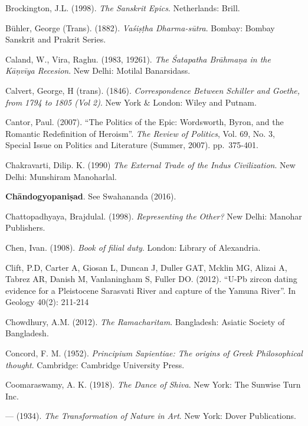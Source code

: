 \begin{thebibliography}{99}
Brockington, J.L. (1998). {\sl The Sanskrit Epics}. Netherlands: Brill.

Bühler, George (Trans). (1882). {\sl Vaśiṣṭha Dharma-sūtra}. Bombay: Bombay Sanskrit and Prakrit Series. 

Caland, W., Vira, Raghu. (1983, 19261). {\sl The Śatapatha Brāhmaṇa in the Kāṇvīya Recesion}. New Delhi: Motilal Banarsidass. 

Calvert, George, H (trans). (1846). {\sl Correspondence Between Schiller and Goethe, from 1794 to 1805 (Vol 2)}. New York \& London: Wiley and Putnam.  

Cantor, Paul. (2007). “The Politics of the Epic: Wordsworth, Byron, and the Romantic Redefinition of Heroism”. {\sl The Review of Politics}, Vol. 69, No. 3, Special Issue on Politics and Literature (Summer, 2007). pp.~375-401.

Chakravarti, Dilip. K. (1990) {\sl The External Trade of the Indus Civilization}. New Delhi: Munshiram Manoharlal. 

{\bf Chāndogyopaniṣad}. See Swahananda (2016).

Chattopadhyaya, Brajdulal. (1998). {\sl Representing the Other?} New Delhi: Manohar Publishers. 

Chen, Ivan. (1908). {\sl Book of filial duty}. London: Library of Alexandria. 

Clift, P.D, Carter A, Giosan L, Duncan J, Duller GAT, Mcklin MG, Alizai A, Tabrez AR, Danish M, Vanlaningham S, Fuller DO. (2012). “U-Pb zircon dating evidence for a Pleistocene Sarasvati River and capture of the Yamuna River”. In Geology 40(2): 211-214

Chowdhury, A.M. (2012). {\sl The Ramacharitam}. Bangladesh: Asiatic Society of Bangladesh. 

Concord, F. M. (1952). {\sl Principium Sapientiae: The origins of Greek Philosophical thought}. Cambridge: Cambridge University Press. 

Coomaraswamy, A. K. (1918). {\sl The Dance of Shiva}. New York: The Sunwise Turn Inc. 

--- (1934). {\sl The Transformation of Nature in Art}. New York: Dover Publications.


\end{thebibliography}
